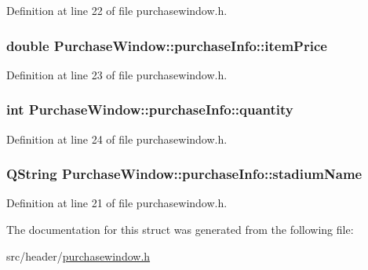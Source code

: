 Definition at line 22 of file purchasewindow.\+h.

\subsubsection[{\texorpdfstring{item\+Price}{itemPrice}}]{\setlength{\rightskip}{0pt plus 5cm}double Purchase\+Window\+::purchase\+Info\+::item\+Price}\hypertarget{struct_purchase_window_1_1purchase_info_a411ad453985ea6da851b601b2224e169}{}\label{struct_purchase_window_1_1purchase_info_a411ad453985ea6da851b601b2224e169}


Definition at line 23 of file purchasewindow.\+h.

\subsubsection[{\texorpdfstring{quantity}{quantity}}]{\setlength{\rightskip}{0pt plus 5cm}int Purchase\+Window\+::purchase\+Info\+::quantity}\hypertarget{struct_purchase_window_1_1purchase_info_a2d9677095f95648ad805d8abafeae063}{}\label{struct_purchase_window_1_1purchase_info_a2d9677095f95648ad805d8abafeae063}


Definition at line 24 of file purchasewindow.\+h.

\subsubsection[{\texorpdfstring{stadium\+Name}{stadiumName}}]{\setlength{\rightskip}{0pt plus 5cm}Q\+String Purchase\+Window\+::purchase\+Info\+::stadium\+Name}\hypertarget{struct_purchase_window_1_1purchase_info_a36aa0c95851cabe4198c52a415936830}{}\label{struct_purchase_window_1_1purchase_info_a36aa0c95851cabe4198c52a415936830}


Definition at line 21 of file purchasewindow.\+h.



The documentation for this struct was generated from the following file\+:\begin{DoxyCompactItemize}
\item 
src/header/\hyperlink{purchasewindow_8h}{purchasewindow.\+h}\end{DoxyCompactItemize}
